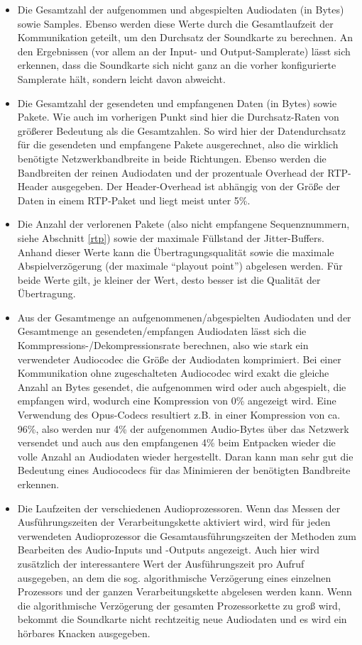 \begin{itemize}
\item Die Gesamtzahl der aufgenommen und abgespielten Audiodaten (in Bytes) sowie Samples. Ebenso werden diese Werte durch die Gesamtlaufzeit der Kommunikation geteilt, um den Durchsatz der Soundkarte zu berechnen. An den Ergebnissen (vor allem an der Input- und Output-Samplerate) lässt sich erkennen, dass die Soundkarte sich nicht ganz an die vorher konfigurierte Samplerate hält, sondern leicht davon abweicht.
\item Die Gesamtzahl der gesendeten und empfangenen Daten (in Bytes) sowie Pakete. Wie auch im vorherigen Punkt sind hier die Durchsatz-Raten von größerer Bedeutung als die Gesamtzahlen. So wird hier der Datendurchsatz für die gesendeten und empfangene Pakete ausgerechnet, also die wirklich benötigte Netzwerkbandbreite in beide Richtungen. Ebenso werden die Bandbreiten der reinen Audiodaten und der prozentuale Overhead der RTP-Header ausgegeben. Der Header-Overhead ist abhängig von der Größe der Daten in einem RTP-Paket und liegt meist unter 5\%.
\item Die Anzahl der verlorenen Pakete (also nicht empfangene Sequenznummern, siehe Abschnitt \ref{rtp}) sowie der maximale Füllstand der Jitter-Buffers. Anhand dieser Werte kann die Übertragungsqualität sowie die maximale Abspielverzögerung (der maximale \enquote{playout point}) abgelesen werden. Für beide Werte gilt, je kleiner der Wert, desto besser ist die Qualität der Übertragung.
\item Aus der Gesamtmenge an aufgenommenen/abgespielten Audiodaten und der Gesamtmenge an gesendeten/empfangen Audiodaten lässt sich die Kommpres\-sions-/Dekompressionsrate berechnen, also wie stark ein verwendeter Audiocodec die Größe der Audiodaten komprimiert. Bei einer Kommunikation ohne zugeschalteten Audiocodec wird exakt die gleiche Anzahl an Bytes gesendet, die aufgenommen wird oder auch abgespielt, die empfangen wird, wodurch eine Kompression von 0\% angezeigt wird. Eine Verwendung des Opus-Codecs resultiert z.B. in einer Kompression von ca. 96\%, also werden nur 4\% der aufgenommen Audio-Bytes über das Netzwerk versendet und auch aus den empfangenen 4\% beim Entpacken wieder die volle Anzahl an Audiodaten wieder hergestellt. Daran kann man sehr gut die Bedeutung eines Audiocodecs für das Minimieren der benötigten Bandbreite erkennen.
\item Die Laufzeiten der verschiedenen Audioprozessoren. Wenn das Messen der Ausführungszeiten der Verarbeitungskette aktiviert wird, wird für jeden verwendeten Audioprozessor die Gesamtausführungszeiten der Methoden zum Bearbeiten des Audio-Inputs und -Outputs angezeigt. Auch hier wird zusätzlich der interessantere Wert der Ausführungszeit pro Aufruf ausgegeben, an dem die sog. algorithmische Verzögerung eines einzelnen Prozessors und der ganzen Verarbeitungskette abgelesen werden kann. Wenn die algorithmische Verzögerung der gesamten Prozessorkette zu groß wird, bekommt die Soundkarte nicht rechtzeitig neue Audiodaten und es wird ein hörbares Knacken ausgegeben.
\end{itemize}

